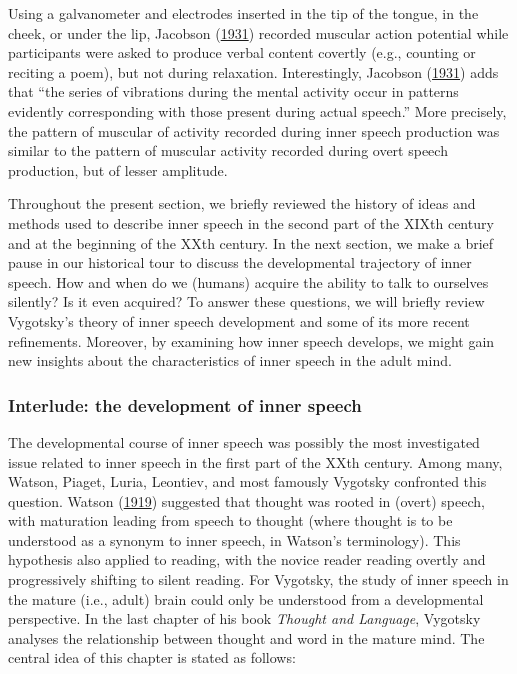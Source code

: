 \documentclass[a4paper,12pt,twoside,onecolumn,openright,final,oldfontcommands]{memoir}
\begin{document}
Using a galvanometer and electrodes inserted in the tip of the tongue, in the cheek, or under the lip, Jacobson (\protect\hyperlink{ref-jacobson_electrical_1931}{1931}) recorded muscular action potential while participants were asked to produce verbal content covertly (e.g., counting or reciting a poem), but not during relaxation. Interestingly, Jacobson (\protect\hyperlink{ref-jacobson_electrical_1931}{1931}) adds that \enquote{the series of vibrations during the mental activity occur in patterns evidently corresponding with those present during actual speech.} More precisely, the pattern of muscular of activity recorded during inner speech production was similar to the pattern of muscular activity recorded during overt speech production, but of lesser amplitude.

Throughout the present section, we briefly reviewed the history of ideas and methods used to describe inner speech in the second part of the XIXth century and at the beginning of the XXth century. In the next section, we make a brief pause in our historical tour to discuss the developmental trajectory of inner speech. How and when do we (humans) acquire the ability to talk to ourselves silently? Is it even acquired? To answer these questions, we will briefly review Vygotsky's theory of inner speech development and some of its more recent refinements. Moreover, by examining how inner speech develops, we might gain new insights about the characteristics of inner speech in the adult mind.

\hypertarget{development}{%
\subsubsection{Interlude: the development of inner speech}\label{development}}

The developmental course of inner speech was possibly the most investigated issue related to inner speech in the first part of the XXth century. Among many, Watson, Piaget, Luria, Leontiev, and most famously Vygotsky confronted this question. Watson (\protect\hyperlink{ref-watson_psychology_1919}{1919}) suggested that thought was rooted in (overt) speech, with maturation leading from speech to thought (where thought is to be understood as a synonym to inner speech, in Watson's terminology). This hypothesis also applied to reading, with the novice reader reading overtly and progressively shifting to silent reading. For Vygotsky, the study of inner speech in the mature (i.e., adult) brain could only be understood from a developmental perspective. In the last chapter of his book \emph{Thought and Language}, Vygotsky analyses the relationship between thought and word in the mature mind. The central idea of this chapter is stated as follows:
\end{document}
